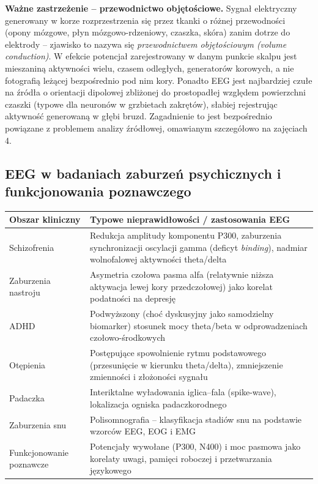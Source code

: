 \documentclass[11pt,a4paper]{article}
\begin{document}
\textbf{Ważne zastrzeżenie -- przewodnictwo objętościowe.} Sygnał elektryczny generowany w korze rozprzestrzenia się przez tkanki o różnej przewodności (opony mózgowe, płyn mózgowo-rdzeniowy, czaszka, skóra) zanim dotrze do elektrody -- zjawisko to nazywa się \emph{przewodnictwem objętościowym (volume conduction)}. W efekcie potencjał zarejestrowany w danym punkcie skalpu jest mieszaniną aktywności wielu, czasem odległych, generatorów korowych, a nie \guillemotleft fotografią\guillemotright{} leżącej bezpośrednio pod nim kory. Ponadto EEG jest najbardziej czułe na źródła o orientacji dipolowej zbliżonej do prostopadłej względem powierzchni czaszki (typowe dla neuronów w grzbietach zakrętów), słabiej rejestrując aktywność generowaną w głębi bruzd. Zagadnienie to jest bezpośrednio powiązane z problemem analizy źródłowej, omawianym szczegółowo na zajęciach 4.

\subsection{EEG w badaniach zaburzeń psychicznych i funkcjonowania poznawczego}
\begin{center}
\begin{tabular}{p{} p{}}
\toprule
\textbf{Obszar kliniczny} &
\textbf{Typowe nieprawidłowości / zastosowania EEG}\\
\midrule
Schizofrenia & Redukcja amplitudy komponentu P300, zaburzenia synchronizacji oscylacji gamma (deficyt \emph{binding}), nadmiar wolnofalowej aktywności theta/delta\\
Zaburzenia nastroju & Asymetria czołowa pasma alfa (relatywnie niższa aktywacja lewej kory przedczołowej) jako korelat podatności na depresję\\
ADHD & Podwyższony (choć dyskusyjny jako samodzielny biomarker) stosunek mocy theta/beta w odprowadzeniach czołowo-środkowych\\
Otępienia & Postępujące spowolnienie rytmu podstawowego (przesunięcie w kierunku theta/delta), zmniejszenie zmienności i złożoności sygnału\\
Padaczka & Interiktalne wyładowania iglica--fala (spike-wave), lokalizacja ogniska padaczkorodnego\\
Zaburzenia snu & Polisomnografia -- klasyfikacja stadiów snu na podstawie wzorców EEG, EOG i EMG\\
Funkcjonowanie poznawcze & Potencjały wywołane (P300, N400) i moc pasmowa jako korelaty uwagi, pamięci roboczej i przetwarzania językowego\\
\bottomrule
\end{tabular}
\end{center}
\end{document}
